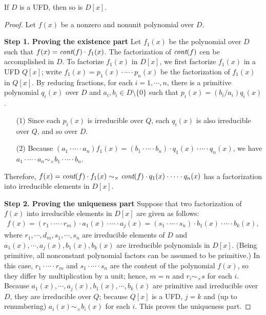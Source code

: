 \begin{thm}
    If $D$ is a UFD, then so is $D[x]$.
\end{thm}
\begin{proof}
    Let $f(x)$ be a nonzero and nonunit polynomial over $D$.

    \textbf{Step 1. Proving the existence part}\newline\noindent
    Let $f_1(x)$ be the polynomial over $D$ such that $f(x)=\textit{cont}(f)\cdot f_1(x)$.
    The factorization of $\textit{cont}(f)$ cen be accomplished in $D$.
    To factorize $f_1(x)$ in $D[x]$, we first factorize $f_1(x)$ in a UFD $Q[x]$; write $f_1(x)=p_1(x)\cdot\cdots\cdot p_n(x)$ be the factorization of $f_1(x)$ in $Q[x]$.
    By reducing fractions, for each $i=1, \cdots, n$, there is a primitive polynomial $q_i(x)$ over $D$ and $a_i, b_i\in D\setminus\{0\}$ such that $p_i(x)=(b_i/a_i) q_i(x)$.
    \begin{enumerate}
        \item[(1)]
        {
            Since each $p_i(x)$ is irreducible over $Q$, each $q_i(x)$ is also irreducible over $Q$, and so over $D$.
        }
        \item[(2)]
        {
            Because $(a_1\cdot\cdots\cdot a_n)f_1(x)=(b_1\cdot\cdots\cdot b_n)\cdot q_1(x)\cdot\cdots\cdot q_n(x)$, we have $a_1\cdot\cdots\cdot a_n\sim_\times b_1\cdot\cdots\cdot b_n$.
        }
    \end{enumerate}
    Therefore, $f(x)=\textit{cont}(f)\cdot f_1(x)\sim_\times \textit{cont}(f)\cdot q_1(x)\cdot\cdots\cdot q_n(x)$ has a factorization into irreducible elements in $D[x]$.

    \textbf{Step 2. Proving the uniqueness part}\newline\noindent
    Suppose that two factorization of $f(x)$ into irreducible elements in $D[x]$ are given as follows:
    \begin{align*}
        f(x)=(r_1\cdot\cdots\cdot r_m)\cdot a_1(x)\cdot\cdots\cdot a_j(x)=(s_1\cdot\cdots\cdot s_n)\cdot b_1(x)\cdot\cdots\cdot b_k(x),
    \end{align*}
    where $r_1, \cdots, d_m, s_1, \cdots, s_n$ are irreducible elements of $D$ and $a_1(x), \cdots, a_j(x), b_1(x), b_k(x)$ are irreducible polynomials in $D[x]$. (Being primitive, all nonconstant polynomial factors can be assumed to be primitive.)
    In this case, $r_1\cdot\cdots\cdot r_m$ and $s_1\cdot\cdots\cdot s_n$ are the content of the polynomial $f(x)$, so they differ by multiplication by a unit; hence, $m=n$ and $r_i\sim_\times s$ for each $i$.
    Because $a_1(x), \cdots, a_j(x), b_1(x), \cdots, b_k(x)$ are primitive and irreducible over $D$, they are irreducible over $Q$; because $Q[x]$ is a UFD, $j=k$ and (up to renumbering) $a_i(x)\sim_\times b_i(x)$ for each $i$.
    This proves the uniqueness part.
\end{proof}

